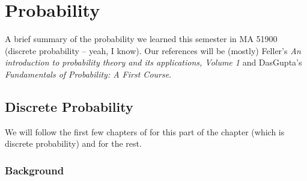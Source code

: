 \chapter{Probability}
A brief summary of the probability we learned this semester in MA 51900
(discrete probability -- yeah, I know). Our references will be (mostly)
Feller's \emph{An introduction to probability theory and its applications,
  Volume 1} \cite{feller} and DasGupta's \emph{Fundamentals of Probability:
A First Course}\cite{dasgupta}.

\section{Discrete Probability}
We will follow the first few chapters of \cite{feller} for this part of the
chapter (which is discrete probability) and \cite{dasgupta} for the rest.
\subsection{Background}


